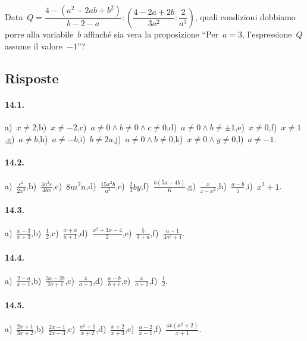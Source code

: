 \begin{esercizio}[\Ast]
\label{ese:14.66}
Data~$Q=\dfrac{4-\left(a^{2}-2ab+b^{2}\right)}{b-2-a}:\left(\dfrac{4-2a+2b}{3a^{2}}:\dfrac{2}{a^{3}}\right)$,
quali condizioni dobbiamo porre alla variabile~$b$ affinché sia vera la proposizione ``Per~$a = 3$, l’espressione~$Q$ assume il valore~$-1$''?
\end{esercizio}
\pagebreak

\subsection{Risposte}

\paragraph{14.1.}
a)~$x\neq 2$,\quad b)~$x\neq -2$,\quad c)~$a\neq 0 \wedge b\neq 0 \wedge c\neq 0$,\quad d)~$a\neq 0 \wedge b\neq \pm 1$,\quad e)~$x\neq 0$,\quad f)~$x\neq 1$,\quad g)~$a\neq b$,\quad h)~$a\neq -b$,\quad i)~$b\neq 2a$,\quad j)~$a\neq 0 \wedge b\neq 0$,\quad k)~$x\neq 0 \wedge y\neq 0$,\quad l)~$a\neq -1$.

\paragraph{14.2.}
a)~$\frac{c^{2}}{2x^{2}}$,\quad b)~$\frac{3a^{2}c}{4bx}$,\quad c)~$8m^{2}n$,\quad d)~$\frac{15x^{2}b}{a^{2}}$,\quad e)~$\frac{2}{3}by$,\quad f)~$\frac{b(5a-4b)}{6}$,\quad g)~$\frac{x}{z-x^{2}}$,\quad h)~$\frac{a-b}{5}$,\quad i)~$x^{2}+1$.

\paragraph{14.3.}
a)~$\frac{x-3}{x+3}$,\quad b)~$\frac{1}{2}$,\quad c)~$\frac{x+a}{a+1}$,\quad d)~$\frac{x^{2}+3x-4}{2}$,\quad e)~$\frac{5}{3+a}$,\quad f)~$\frac{a-1}{3a^{2}+1}$.

\paragraph{14.4.}
a)~$\frac{2-a}{x-1}$,\quad b)~$\frac{3a-2b}{2a+1}$,\quad c)~$\frac{4}{a+3}$,\quad d)~$\frac{a-b}{b+c}$,\quad e)~$\frac{x}{a+2}$,\quad f)~$\frac{1}{2}$.

\paragraph{14.5.}
a)~$\frac{2x+1}{3x+2}$,\quad b)~$\frac{2x-1}{2x-3}$,\quad c)~$\frac{a^2+1}{x+2}$,\quad d)~$\frac{x+2}{x+3}$,\quad e)~$\frac{a-2}{x-1}$,\quad f)~$\frac{4x\left(x^2+2\right)}{x+1}$.

